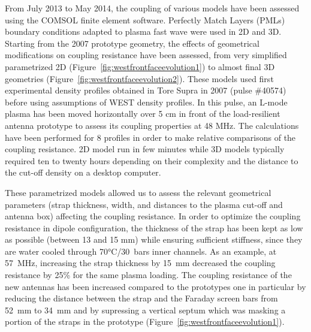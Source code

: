 From July 2013 to May 2014, the coupling of various models have been assessed using the COMSOL finite element software. Perfectly Match Layers (PMLs) boundary conditions adapted to plasma fast wave were used in 2D and 3D. Starting from the 2007 prototype geometry, the effects of geometrical modifications on coupling resistance have been assessed, from very simplified parametrized 2D (Figure~\ref{fig:westfrontfaceevolution1}) to almost final 3D geometries (Figure~\ref{fig:westfrontfaceevolution2}). These models used first experimental density profiles obtained in Tore Supra in 2007 (pulse \#40574) before using assumptions of WEST density profiles. In this pulse, an L-mode plasma has been moved horizontally over 5 cm in front of the load-resilient antenna prototype to assess its coupling properties at 48 MHz. The calculations have been performed for 8 profiles in order to make relative comparisons of the coupling resistance. 2D model run in few minutes while 3D models typically required ten to twenty hours depending on their complexity and the distance to the cut-off density on a desktop computer. 

These parametrized models allowed us to assess the relevant geometrical parameters (strap thickness, width, and distances to the plasma cut-off and antenna box) affecting the coupling resistance. In order to optimize the coupling resistance in dipole configuration, the thickness of the strap has been kept as low as possible (between 13 and 15 mm) while ensuring sufficient stiffness, since they are water cooled through 70$\si{\degreeCelsius}$/30~bars inner channels. As an example, at 57~MHz, increasing the strap thickness by 15~mm decreased the coupling resistance by 25\% for the same plasma loading. The coupling resistance of the new antennas has been increased compared to the prototypes one in particular by reducing the distance between the strap and the Faraday screen bars from 52~mm to 34~mm and by supressing a vertical septum which was masking a portion of the straps in the prototype (Figure~\ref{fig:westfrontfaceevolution1}). 



